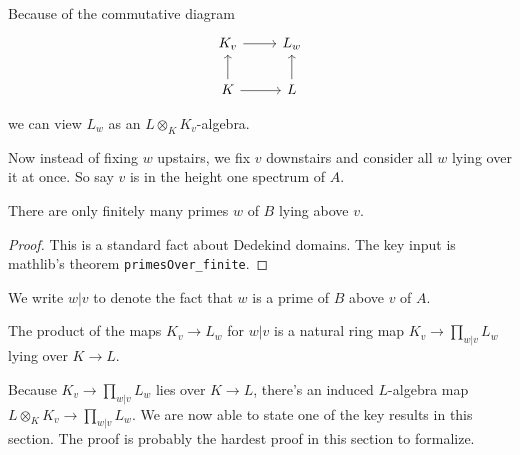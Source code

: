 Because of the commutative diagram
\[
\begin{tikzcd}
K_v \arrow{r} & L_w  \\
K \arrow{u} \arrow{r} & L \arrow{u}
\end{tikzcd}
\]

we can view $L_w$ as an $L\otimes_KK_v$-algebra.

Now instead of fixing $w$ upstairs, we fix $v$ downstairs and consider all $w$ lying
over it at once. So say $v$ is in the height one spectrum of $A$.

\begin{lemma}
  \label{IsDedekindDomain.HeightOneSpectrum.Extension.finite}
  \leanok
  There are only finitely many primes $w$ of $B$ lying above $v$.
\end{lemma}
\begin{proof}
  \leanok
  This is a standard fact about Dedekind domains. The key input is
  mathlib's theorem {\tt primesOver\_finite}.
\end{proof}

We write $w|v$ to denote the fact that $w$ is a prime of $B$ above $v$ of $A$.

\begin{definition}
  \label{IsDedekindDomain.HeightOneSpectrum.adicCompletionComapSemialgHom'}
  \leanok
  The product of the maps $K_v\to L_w$ for $w|v$ is a natural ring map $K_v\to\prod_{w|v}L_w$
  lying over $K\to L$.
\end{definition}

Because $K_v\to\prod_{w|v}L_w$ lies over $K\to L$, there's an induced $L$-algebra
map $L\otimes_KK_v\to\prod_{w|v}L_w$. We are now able to state one of the key results
in this section. The proof is probably the hardest proof
in this section to formalize.

